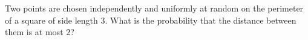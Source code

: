 Two points are chosen independently and uniformly at random on the perimeter of a square of side length $3$. What is the probability that the distance between them is at most $2$?
